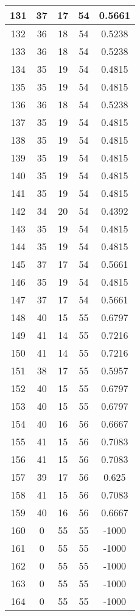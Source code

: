 \documentclass[letterpaper, 12pt]{article}
\begin{document}
\begin{longtable}{|c|c|c|c|c|}
\hline
131 & 37 & 17 & 54 & 0.5661 \\
\hline
132 & 36 & 18 & 54 & 0.5238 \\
\hline
133 & 36 & 18 & 54 & 0.5238 \\
\hline
134 & 35 & 19 & 54 & 0.4815 \\
\hline
135 & 35 & 19 & 54 & 0.4815 \\
\hline
136 & 36 & 18 & 54 & 0.5238 \\
\hline
137 & 35 & 19 & 54 & 0.4815 \\
\hline
138 & 35 & 19 & 54 & 0.4815 \\
\hline
139 & 35 & 19 & 54 & 0.4815 \\
\hline
140 & 35 & 19 & 54 & 0.4815 \\
\hline
141 & 35 & 19 & 54 & 0.4815 \\
\hline
142 & 34 & 20 & 54 & 0.4392 \\
\hline
143 & 35 & 19 & 54 & 0.4815 \\
\hline
144 & 35 & 19 & 54 & 0.4815 \\
\hline
145 & 37 & 17 & 54 & 0.5661 \\
\hline
146 & 35 & 19 & 54 & 0.4815 \\
\hline
147 & 37 & 17 & 54 & 0.5661 \\
\hline
148 & 40 & 15 & 55 & 0.6797 \\
\hline
149 & 41 & 14 & 55 & 0.7216 \\
\hline
150 & 41 & 14 & 55 & 0.7216 \\
\hline
151 & 38 & 17 & 55 & 0.5957 \\
\hline
152 & 40 & 15 & 55 & 0.6797 \\
\hline
153 & 40 & 15 & 55 & 0.6797 \\
\hline
154 & 40 & 16 & 56 & 0.6667 \\
\hline
155 & 41 & 15 & 56 & 0.7083 \\
\hline
156 & 41 & 15 & 56 & 0.7083 \\
\hline
157 & 39 & 17 & 56 & 0.625 \\
\hline
158 & 41 & 15 & 56 & 0.7083 \\
\hline
159 & 40 & 16 & 56 & 0.6667 \\
\hline
160 & 0 & 55 & 55 & -1000 \\
\hline
161 & 0 & 55 & 55 & -1000 \\
\hline
162 & 0 & 55 & 55 & -1000 \\
\hline
163 & 0 & 55 & 55 & -1000 \\
\hline
164 & 0 & 55 & 55 & -1000 \\

\end{longtable}
\end{document}

